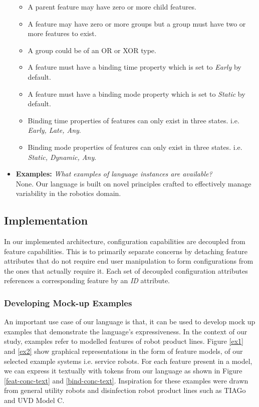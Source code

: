 \documentclass[conference]{IEEEtran}
\begin{document}
\begin{itemize}
\begin{itemize}
            \item A parent feature may have zero or more child features.
            \item A feature may have zero or more groups but a group must have two or more features to exist.
            \item A group could be of an OR or XOR type.
            \item A feature must have a binding time property which is set to \textit{Early} by default.
            \item A feature must have a binding mode property which is set to \textit{Static} by default.
            \item Binding time properties of features can only exist in three states. i.e. \textit{Early, Late, Any}.
            \item Binding mode properties of features can only exist in three states. i.e. \textit{Static, Dynamic, Any}.
        \end{itemize}
        \item \textbf{Examples: }\textit{What examples of language instances are available?}\\
        None. Our language is built on novel principles crafted to effectively manage variability in the robotics domain.
    \end{itemize}
    
\subsection{Implementation}
In our implemented architecture, configuration capabilities are decoupled from feature capabilities. This is to primarily separate concerns by detaching feature attributes that do not require end user manipulation to form configurations from the ones that actually require it. Each set of decoupled configuration attributes references a corresponding feature by an \textit{ID} attribute.

\subsubsection{Developing Mock-up Examples}
An important use case of our language is that, it can be used to develop mock up examples that demonstrate the language's expressiveness. In the context of our study, examples refer to modelled features of robot product lines. Figure \ref{ex1} and \ref{ex2} show graphical representations in the form of feature models, of our selected example systems i.e. service robots. For each feature present in a model, we can express it textually with tokens from our language as shown in Figure \ref{feat-conc-text} and \ref{bind-conc-text}. Inspiration for these examples were drawn from general utility robots and disinfection robot product lines such as TIAGo and UVD Model C.
    
\end{document}
